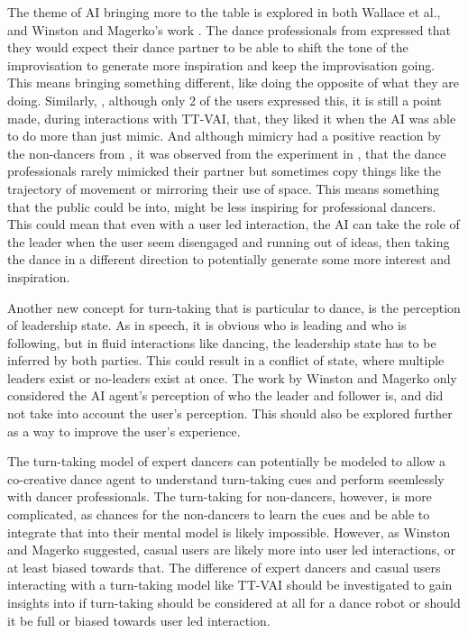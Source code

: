 \documentclass[final,5p,times,twocolumn,authoryear]{article}
\begin{document}
The theme of AI bringing more to the table is explored in both Wallace
et al., and Winston and Magerko's work \cite{Wallace2023,
Winston2017}. The dance professionals from \cite{Wallace2023}
expressed that they would expect their dance partner to be able to shift
the tone of the improvisation to generate more inspiration and keep the
improvisation going. This means bringing something different, like doing
the opposite of what they are doing. Similarly, \cite{Winston2017},
although only 2 of the users expressed this, it is still a point made,
during interactions with TT-VAI, that, they liked it when the AI was
able to do more than just mimic. And although mimicry
had a positive reaction by the non-dancers from \cite{Winston2017}, it
was observed from the experiment in \cite{Wallace2023}, that the
dance professionals rarely mimicked their partner but sometimes copy
things like the trajectory of movement or mirroring their use of space.
This means something that the public could be into, might be less
inspiring for professional dancers. This could mean that even with a
user led interaction, the AI can take the role of the leader when the
user seem disengaged and running out of ideas, then taking the dance in
a different direction to potentially generate some more interest and inspiration.

Another new concept for turn-taking that is particular to dance, is the
perception of leadership state. As in speech, it is obvious who is
leading and who is following, but in fluid interactions like dancing,
the leadership state has to be inferred by both parties. This could
result in a conflict of state, where multiple leaders exist or
no-leaders exist at once. The work by Winston and Magerko only
considered the AI agent's perception of who the leader and follower is,
and did not take into account the user's perception. This should also be
explored further as a way to improve the user's experience.

The turn-taking model of expert dancers can potentially be modeled to
allow a co-creative dance agent to understand turn-taking cues and
perform seemlessly with dancer professionals. The turn-taking for
non-dancers, however, is more complicated, as chances for the
non-dancers to learn the cues and be able to integrate that into their
mental model is likely impossible. However, as Winston and Magerko
suggested, casual users are likely more into user led interactions, or
at least biased towards that. The difference of expert dancers and
casual users interacting with a turn-taking model like TT-VAI should be
investigated to gain insights into if turn-taking should be considered
at all for a dance robot or should it be full or biased towards user led interaction.
\end{document}
